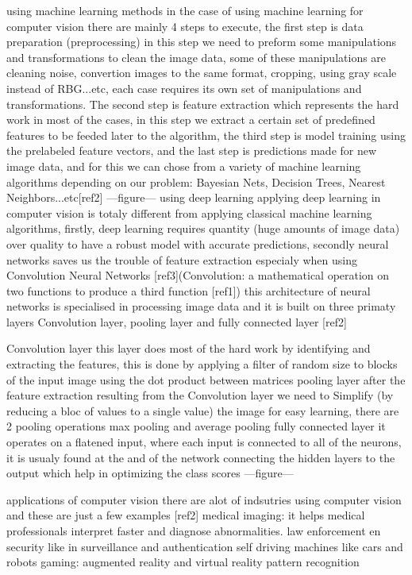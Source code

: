     using machine learning methods
        in the case of using machine learning for computer vision there are mainly 4 steps to execute, the first step is data preparation (preprocessing) in this step we need to preform some manipulations and transformations to clean the image data, some of these manipulations are cleaning noise, convertion images to the same format, cropping, using gray scale instead of RBG...etc, each case requires its own set of manipulations and transformations. The second step is feature extraction which represents the hard work in most of the cases, in this step we extract a certain set of predefined features to be feeded later to the algorithm, the third step is model training using the prelabeled feature vectors, and the last step is predictions made for new image data, and for this we can chose from a variety of machine learning algorithms depending on our problem: Bayesian Nets, Decision Trees, Nearest Neighbors...etc[ref2]
        ---figure---
    using deep learning 
        applying deep learning in computer vision is totaly different from applying classical machine learning algorithms, firstly,  deep learning requires quantity (huge amounts of image data) over quality to have a robust model with accurate predictions, secondly neural networks saves us the trouble of feature extraction especialy when using Convolution Neural Networks [ref3](Convolution: a mathematical operation on two functions to produce a third function [ref1]) this architecture of neural networks is specialised in processing image data and it is built on three primaty layers Convolution layer, pooling layer and fully connected layer [ref2]

        Convolution layer
            this layer does most of the hard work by identifying and extracting the features, this is done by applying a filter of random size to blocks of the input image using the dot product between matrices
        pooling layer 
            after the feature extraction resulting from the Convolution layer we need to Simplify (by reducing a bloc of values to a single value) the image for easy learning, there are 2 pooling operations max pooling and average pooling 
        fully connected layer
            it operates on a flatened input, where each input is connected to all of the neurons, it is usualy found at the and of the network connecting the hidden layers to the output which help in optimizing the class scores
        ---figure---
    

    applications of computer vision
        there are alot of indsutries using computer vision and these are just a few examples [ref2]
        medical imaging: 
            it helps medical professionals interpret faster and diagnose abnormalities.
        law enforcement en security
            like in surveillance and authentication
        self driving machines like cars and robots
        gaming: augmented reality and virtual reality
        pattern recognition

